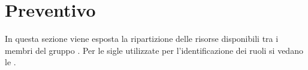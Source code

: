 \section{Preventivo}
In questa sezione viene esposta la ripartizione delle risorse disponibili tra i membri del gruppo \Gruppo{}. Per le sigle utilizzate per l'identificazione dei ruoli si vedano le \NdPv{}.




